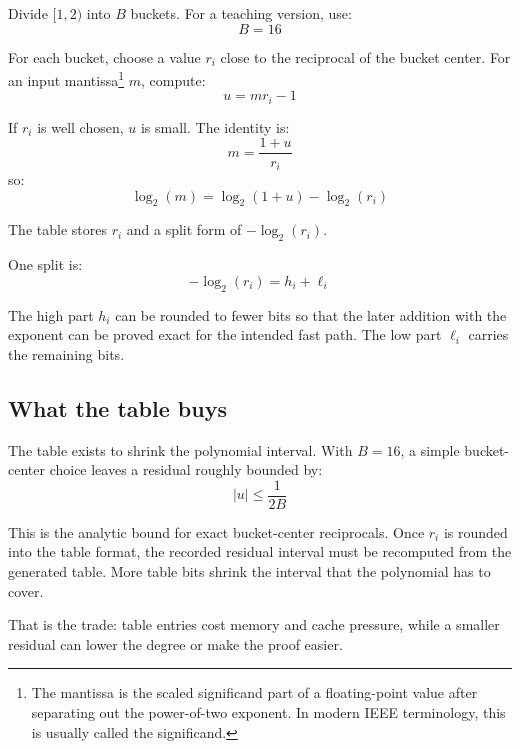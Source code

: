 \documentclass[manuscript, nonacm]{acmart}
\begin{document}
    Divide $[1, 2)$ into $B$ buckets. For a teaching version, use:
    \[ B = 16 \]

    For each bucket, choose a value $r_i$ close to the reciprocal of the bucket
    center. For an input mantissa\footnote{The mantissa is the scaled significand part of a floating-point value after separating out the power-of-two exponent. In modern IEEE terminology, this is usually called the significand.} $m$, compute:
    \[ u = m r_i - 1 \]

    If $r_i$ is well chosen, $u$ is small. The identity is:
    \[ m = \frac{1 + u}{r_i} \]
    so:
    \[ \log_2(m) = \log_2(1 + u) - \log_2(r_i) \]

    The table stores $r_i$ and a split form of $-\log_2(r_i)$.

    One split is:
    \[ -\log_2(r_i) = h_i + \ell_i \]

    The high part $h_i$ can be rounded to fewer bits so that the later addition
    with the exponent can be proved exact for the intended fast path. The low part $\ell_i$ carries the
    remaining bits.

    \subsection{What the table buys}

    The table exists to shrink the polynomial interval. With $B = 16$, a simple
    bucket-center choice leaves a residual roughly bounded by:
    \[ |u| \le \frac{1}{2B} \]

    This is the analytic bound for exact bucket-center reciprocals. Once $r_i$
    is rounded into the table format, the recorded residual interval must be
    recomputed from the generated table. More table bits shrink the interval
    that the polynomial has to cover.

    That is the trade: table entries cost memory and cache pressure, while a
    smaller residual can lower the degree or make the proof easier.
\end{document}
